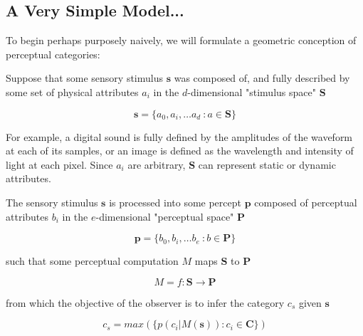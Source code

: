 \begin{multicols}{2}

\subsection{A Very Simple Model...}

To begin perhaps purposely naively, we will formulate a geometric conception of perceptual categories:

Suppose that some sensory stimulus $\mathbf{s}$ was composed of, and fully described by some set of physical attributes $a_i$ in the $d$-dimensional "stimulus space" $\mathbf{S}$

\begin{equation}
\mathbf{s} = \{a_0, a_i, \dots a_d\ : a \in \mathbf{S}\}
\end{equation}

For example, a digital sound is fully defined by the amplitudes of the waveform at each of its samples, or an image is defined as the wavelength and intensity of light at each pixel. Since $a_i$ are arbitrary, $\mathbf{S}$ can represent static or dynamic attributes. 

The sensory stimulus $\mathbf{s}$ is processed into some percept $\mathbf{p}$ composed of perceptual attributes $b_i$ in the $e$-dimensional "perceptual space" $\mathbf{P}$

\begin{equation}
\mathbf{p} = \{b_0, b_i, \dots b_e\ : b \in \mathbf{P}\}
\end{equation}

such that some perceptual computation $M$ maps $\mathbf{S}$ to $\mathbf{P}$

\begin{equation}
M = f: \mathbf{S} \to \mathbf{P}
\end{equation} 

from which the objective of the observer is to infer the category $c_s$ given $\mathbf{s}$ 

\begin{equation}
c_s = max( \{ p(c_i | M(\mathbf{s})) : c_i \in \mathbf{C} \})
\end{equation}


\end{multicols}

